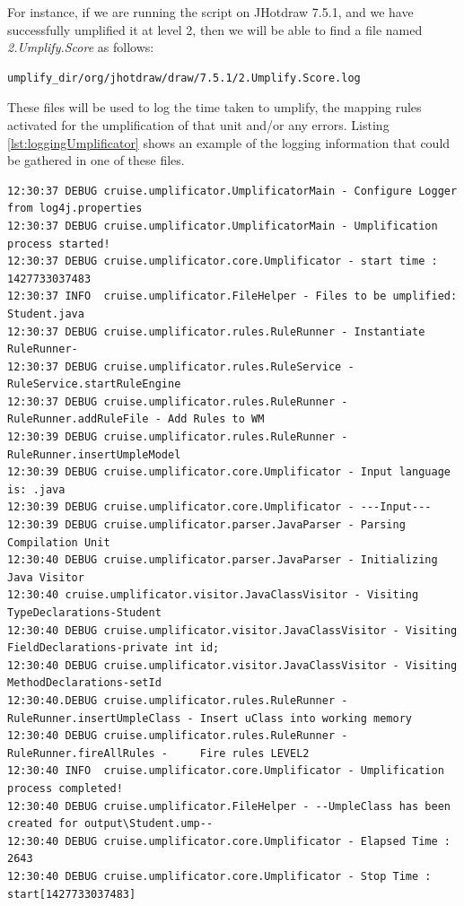 For instance, if we are running the script on JHotdraw 7.5.1, and we have successfully umplified it at level 2, then we will be able to find a file named \textit{2.Umplify.Score} as follows:

\vspace{\baselineskip}
\begin{lstlisting}[style=umplePlain]
   umplify_dir/org/jhotdraw/draw/7.5.1/2.Umplify.Score.log
\end{lstlisting}


These files will be used to log the time taken to umplify, the mapping rules activated for the umplification of that unit and/or any errors. Listing \ref{lst:loggingUmplificator} shows an example of the logging information that could be gathered in one of these files.
\begin{lstlisting}[style=umplePlain, caption= Logging Information Sample gathered by the Umplificator, label=lst:loggingUmplificator]
12:30:37 DEBUG cruise.umplificator.UmplificatorMain - Configure Logger from log4j.properties
12:30:37 DEBUG cruise.umplificator.UmplificatorMain - Umplification process started!
12:30:37 DEBUG cruise.umplificator.core.Umplificator - start time : 1427733037483
12:30:37 INFO  cruise.umplificator.FileHelper - Files to be umplified: Student.java
12:30:37 DEBUG cruise.umplificator.rules.RuleRunner - Instantiate RuleRunner- 
12:30:37 DEBUG cruise.umplificator.rules.RuleService - RuleService.startRuleEngine
12:30:37 DEBUG cruise.umplificator.rules.RuleRunner - RuleRunner.addRuleFile - Add Rules to WM
12:30:39 DEBUG cruise.umplificator.rules.RuleRunner - RuleRunner.insertUmpleModel 
12:30:39 DEBUG cruise.umplificator.core.Umplificator - Input language is: .java
12:30:39 DEBUG cruise.umplificator.core.Umplificator - ---Input---
12:30:39 DEBUG cruise.umplificator.parser.JavaParser - Parsing Compilation Unit
12:30:40 DEBUG cruise.umplificator.parser.JavaParser - Initializing Java Visitor 
12:30:40 cruise.umplificator.visitor.JavaClassVisitor - Visiting TypeDeclarations-Student
12:30:40 DEBUG cruise.umplificator.visitor.JavaClassVisitor - Visiting FieldDeclarations-private int id;
12:30:40 DEBUG cruise.umplificator.visitor.JavaClassVisitor - Visiting MethodDeclarations-setId
12:30:40.DEBUG cruise.umplificator.rules.RuleRunner - RuleRunner.insertUmpleClass - Insert uClass into working memory
12:30:40 DEBUG cruise.umplificator.rules.RuleRunner - RuleRunner.fireAllRules -     Fire rules LEVEL2
12:30:40 INFO  cruise.umplificator.core.Umplificator - Umplification process completed!
12:30:40 DEBUG cruise.umplificator.FileHelper - --UmpleClass has been created for output\Student.ump--
12:30:40 DEBUG cruise.umplificator.core.Umplificator - Elapsed Time : 2643
12:30:40 DEBUG cruise.umplificator.core.Umplificator - Stop Time : start[1427733037483]
\end{lstlisting}

